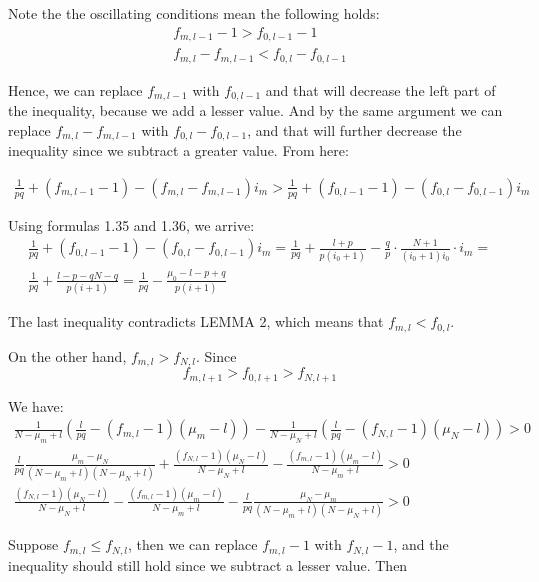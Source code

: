 \documentclass[11pt,draft]{article}
\begin{document}
Note the the oscillating conditions mean the following holds:
\begin{align}
f_{m,l-1} - 1 > f_{0,l-1} - 1 \\
 f_{m,l} -  f_{m,l-1} <  f_{0,l} -  f_{0,l-1}
\end{align}

Hence, we can replace $f_{m,l-1}$ with $f_{0,l-1}$ and that will decrease the left part of the inequality, because we add a lesser value.  And by the same argument we can replace  $f_{m,l} -  f_{m,l-1}$  with $f_{0,l} -  f_{0,l-1}$, and that will further decrease the inequality since we subtract a greater value.  From here:

\begin{align}
\frac{1}{pq} + (f_{m,l-1} - 1) - (f_{m,l} -  f_{m,l-1})i_m  > \frac{1}{pq} + (f_{0,l-1} - 1) - (f_{0,l} -  f_{0,l-1})i_m
\end{align}

Using formulas 1.35 and 1.36, we arrive:
\begin{align}
\frac{1}{pq} + (f_{0,l-1} - 1) - (f_{0,l} -  f_{0,l-1})i_m  = \frac{1}{pq} + \frac{l + p}{p(i_0+1)} -  \frac{q}{p} \cdot \frac{N+1}{(i_0+1)i_0} \cdot i_m = \\
\frac{1}{pq} +  \frac{l-p-qN - q}{p(i+1)} = \frac{1}{pq} - \frac{\mu_0 - l  - p + q}{p(i+1)}
\end{align}

\clearpage


The last inequality contradicts LEMMA 2, which means that $f_{m,l} < f_{0,l}$.

On the other hand,  $f_{m,l} >  f_{N,l}$.  Since
\[ f_{m,{l+1}} > f_{0,{l+1}} > f_{N,{l+1}} \]

We have:
\begin{align}
\frac{1}{N-\mu_m + l}(\frac{l}{pq} - (f_{m,l} - 1)(\mu_m - l)) -  \frac{1}{N-\mu_N + l}(\frac{l}{pq} - (f_{N,l} - 1)(\mu_N - l))  > 0\\
 \frac{l}{pq} \frac{\mu_m - \mu_N}{(N-\mu_m + l)(N-\mu_N + l)} + \frac{(f_{N,l} - 1)(\mu_N - l)}{N-\mu_N + l} - \frac{(f_{m,l} - 1)(\mu_m - l)}{N-\mu_m + l} > 0 \\
\frac{(f_{N,l} - 1)(\mu_N - l)}{N-\mu_N + l} - \frac{(f_{m,l} - 1)(\mu_m - l)}{N-\mu_m + l} -   \frac{l}{pq} \frac{\mu_N- \mu_m}{(N-\mu_m + l)(N-\mu_N + l)} > 0 
\end{align}

Suppose $f_{m,l} \le f_{N,l}$, then we can replace $f_{m,l} - 1$ with $f_{N,l} - 1$, and the inequality should still hold since we subtract a lesser value. Then
\end{document}
